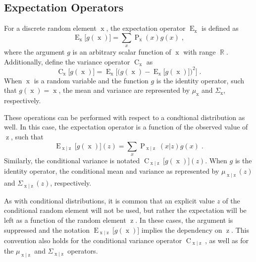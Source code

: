 \documentclass[12pt]{report}
\DeclareMathOperator{\xrm}{\mathrm{x}}
\DeclareMathOperator{\zrm}{\mathrm{z}}
\DeclareMathOperator{\Prm}{\mathrm{P}}
\DeclareMathOperator{\Erm}{\mathrm{E}}
\DeclareMathOperator{\Crm}{\mathrm{C}}
\DeclareMathOperator{\Rbb}{\mathbb{R}}
\begin{document}
\subsection*{Expectation Operators}

For a discrete random element $\xrm$, the expectation operator $\Erm_{\xrm}$ is defined as
\begin{equation}
\Erm_{\xrm}\big[ g(\xrm) \big] = \sum_{x} \Prm_{\xrm}(x) g(x) \;,
\end{equation}
where the argument $g$ is an arbitrary scalar function of $\xrm$ with range $\Rbb$. Additionally, define the variance operator $\Crm_{\xrm}$ as
\begin{equation}
\Crm_{\xrm}\big[g(\xrm)\big] = \Erm_{\xrm} \bigg[ \Big( g(\xrm) - \Erm_{\xrm}\big[g(\xrm)\big] \Big)^2 \bigg] \;.
\end{equation}
When $\xrm$ is a random variable and the function $g$ is the identity operator, such that $g(\xrm) = \xrm$, the mean and variance are represented by $\mu_{\xrm}$ and $\Sigma_{\xrm}$, respectively.

These operations can be performed with respect to a condtional distribution as well. In this case, the expectation operator is a function of the observed value of $\zrm$, such that
\begin{equation}
\Erm_{\xrm | \zrm}\big[ g(\xrm) \big](z) = \sum_{x} \Prm_{\xrm | \zrm}(x | z) g(x) \;.
\end{equation}
Similarly, the conditional variance is notated $\Crm_{\xrm | \zrm}\big[ g(\xrm) \big](z)$. When $g$ is the identity operator, the conditional mean and variance as represented by $\mu_{\xrm | \zrm}(z)$ and $\Sigma_{\xrm | \zrm}(z)$, respectively.

As with conditional distributions, it is common that an explicit value $z$ of the conditional random element will not be used, but rather the expectation will be left as a function of the random element $\zrm$. In these cases, the argument is suppressed and the notation $\Erm_{\xrm | \zrm}\big[ g(\xrm) \big]$ implies the dependency on $\zrm$. This convention also holds for the conditional variance operator $\Crm_{\xrm | \zrm}$, as well as for the $\mu_{\xrm | \zrm}$ and $\Sigma_{\xrm | \zrm}$ operators.
\end{document}
